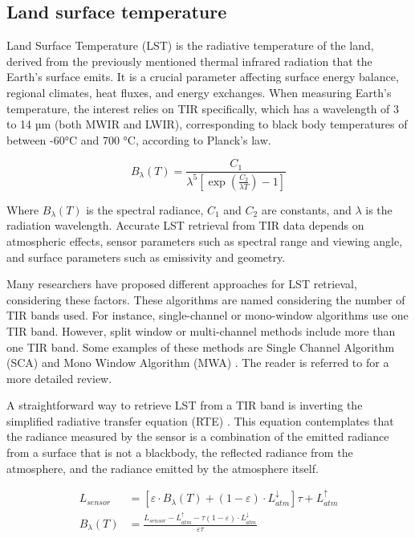     \subsection{Land surface temperature}


        Land Surface Temperature (LST) is the radiative temperature of the land, derived from the previously mentioned thermal infrared radiation that the Earth's surface emits. It is a crucial parameter affecting surface energy balance, regional climates, heat fluxes, and energy exchanges.
        When measuring Earth's temperature, the interest relies on TIR specifically, which has a wavelength of 3 to 14 µm (both MWIR and LWIR), corresponding to black body temperatures of between -60°C and 700 °C, according to Planck's law.

        \begin{equation}
            B_{\lambda}(T) = \frac{C_1}{\lambda^5 \left[ \exp\left(\frac{C_2}{\lambda T}\right) - 1\right]}
        \end{equation}

        Where $B_{\lambda}(T)$ is the spectral radiance, $C_1$ and $C_2$ are constants, and $\lambda$ is the radiation wavelength.
        Accurate LST retrieval from TIR data depends on atmospheric effects, sensor parameters such as spectral range and viewing angle, and surface parameters such as emissivity and geometry.
        
        Many researchers have proposed different approaches for LST retrieval, considering these factors.
        These algorithms are named considering the number of TIR bands used. For instance, single-channel or mono-window algorithms use one TIR band. However, split window or multi-channel methods include more than one TIR band. Some examples of these methods are Single Channel Algorithm (SCA) \cite{sca2009} and Mono Window Algorithm (MWA) \cite{mwa2001}. The reader is referred to \cite{LI201314} for a more detailed review.


        A straightforward way to retrieve LST from a TIR band is inverting the simplified radiative transfer equation (RTE) \cite{becker90}. This equation contemplates that the radiance measured by the sensor is a combination of the emitted radiance from a surface that is not a blackbody, the reflected radiance from the atmosphere, and the radiance emitted by the atmosphere itself.


        \begin{equation}
            \begin{aligned}
            L_{sensor} &= \left[ \varepsilon \cdot B_{\lambda}(T) + (1 - \varepsilon) \cdot L_{atm}^{\downarrow} \right] \tau + L_{atm}^{\uparrow} \\
            B_\lambda (T) &= \frac{L_{sensor} - L_{atm}^{\uparrow}- \tau (1 - \varepsilon) \cdot L_{atm}^{\downarrow}}{\varepsilon \tau} 
            \end{aligned}
        \end{equation}

